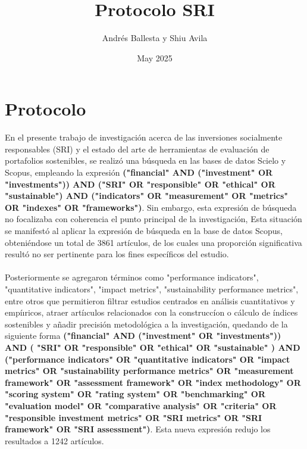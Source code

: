 \documentclass[12pt]{article}
\title{Protocolo SRI}
\author{Andrés Ballesta y Shiu Avila}
\date{May 2025}
\begin{document}
\maketitle

\section{Protocolo}
En el presente trabajo de investigaci\'on acerca de las inversiones socialmente responsables (SRI) y el estado del arte de herramientas de evaluación de portafolios sostenibles, se realiz\'o una búsqueda en las bases de datos Scielo y Scopus, empleando la expresi\'on \textbf{("financial" AND ("investment" OR "investments"))
AND ("SRI" OR "responsible" OR "ethical" OR "sustainable")
AND ("indicators" OR "measurement" OR "metrics" OR "indexes" OR "frameworks")}. Sin embargo, esta expresi\'on de b\'usqueda no focalizaba con coherencia el punto principal de la investigaci\'on, Esta situaci\'on se manifest\'o al aplicar la expresi\'on de b\'usqueda en la base de datos Scopus, obteni\'endose un total de 3861 art\'iculos, de los cuales una proporci\'on significativa result\'o no ser pertinente para los fines espec\'ificos del estudio.\\
\\
Posteriormente se agregaron t\'erminos como "performance indicators", "quantitative indicators", "impact metrics", "sustainability performance metrics", entre otros que permitieron filtrar estudios centrados en an\'alisis cuantitativos y emp\'iıricos, atraer art\'iıculos relacionados con la construcc\'ion o c\'alculo de \'indices sostenibles y añadir precisi\'on metodol\'ogica a la investigaci\'on, quedando de la siguiente forma \textbf{("financial" AND ("investment" OR "investments"))
AND ( "SRI" OR "responsible" OR "ethical" OR "sustainable" ) AND ("performance indicators" OR "quantitative indicators" OR "impact metrics" OR "sustainability performance metrics" OR "measurement framework" OR "assessment framework" OR "index methodology" OR "scoring system" OR "rating system" OR "benchmarking" OR "evaluation model" OR "comparative analysis" OR "criteria" OR "responsible investment metrics" OR "SRI metrics" OR "SRI framework" OR "SRI assessment")}. Esta nueva expresi\'on redujo los resultados a 1242 art\'iculos.\\
\\
\end{document}
